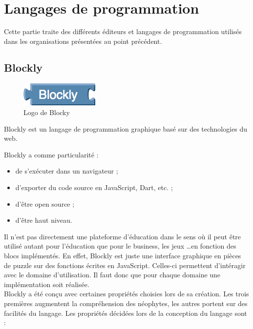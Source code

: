 \section{Langages de programmation}
\label{langages}
Cette partie traite des différents éditeurs et langages de programmation utilisés dans les organisations présentées au point précédent.

\subsection{Blockly}
\label{blockly}

\begin{figure}[!ht]
  \begin{center}
    \includegraphics[scale=0.5]{content/5-related_work/images/blocky}
    \caption{Logo de Blocky}
    \label{fig:blocky}
  \end{center}
\end{figure}
Blockly \cite{blockly} est un langage de programmation graphique basé sur des technologies du web.

Blockly a comme particularité :
\begin{itemize}
\item de s'exécuter dans un navigateur ;
\item d'exporter du code source en JavaScript, Dart, etc. ;
\item d'être open source ;
\item d'être haut niveau.
\end{itemize}

Il n'est pas directement une plateforme d'éducation dans le sens où il peut être utilisé autant pour l'éducation que pour le business, les jeux \ldots en fonction des \glspl{bloc} implémentés. En effet, Blockly est juste une interface graphique en pièces de puzzle sur des fonctions écrites en JavaScript. Celles-ci permettent d'intéragir avec le domaine d'utilisation. Il faut donc que pour chaque domaine une implémentation soit réalisée.\\

Blockly a été conçu avec certaines propriétés choisies lors de sa création. Les trois premières augmentent la compréhension des néophytes, les autres portent sur des facilités du langage. Les propriétés décidées lors de la conception du langage sont \cite{blockly-lang} :

